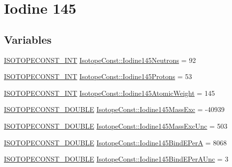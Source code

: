 \hypertarget{group___isotope_const-_iodine-_i145}{}\section{Iodine 145}
\label{group___isotope_const-_iodine-_i145}
\subsection*{Variables}
\begin{DoxyCompactItemize}
\item 
\mbox{\hyperlink{group___isotope_const-_macros_ga5f18360b3e99483a35c32d789e62621c}{I\+S\+O\+T\+O\+P\+E\+C\+O\+N\+S\+T\+\_\+\+I\+NT}} \mbox{\hyperlink{group___isotope_const-_iodine-_i145_ga98c708b0f66b0d1a351314b264bee606}{Isotope\+Const\+::\+Iodine145\+Neutrons}} = 92
\item 
\mbox{\hyperlink{group___isotope_const-_macros_ga5f18360b3e99483a35c32d789e62621c}{I\+S\+O\+T\+O\+P\+E\+C\+O\+N\+S\+T\+\_\+\+I\+NT}} \mbox{\hyperlink{group___isotope_const-_iodine-_i145_gaf9b6429ceabd260cfe07869c8b78bfd1}{Isotope\+Const\+::\+Iodine145\+Protons}} = 53
\item 
\mbox{\hyperlink{group___isotope_const-_macros_ga5f18360b3e99483a35c32d789e62621c}{I\+S\+O\+T\+O\+P\+E\+C\+O\+N\+S\+T\+\_\+\+I\+NT}} \mbox{\hyperlink{group___isotope_const-_iodine-_i145_ga7cd8212733b4a80c68896ba0a40a1b26}{Isotope\+Const\+::\+Iodine145\+Atomic\+Weight}} = 145
\item 
\mbox{\hyperlink{group___isotope_const-_macros_ga8f45a7272ce02c0b4c65c44636ed719a}{I\+S\+O\+T\+O\+P\+E\+C\+O\+N\+S\+T\+\_\+\+D\+O\+U\+B\+LE}} \mbox{\hyperlink{group___isotope_const-_iodine-_i145_gaa3583106a50250e7c514f4ed6eaf710d}{Isotope\+Const\+::\+Iodine145\+Mass\+Exc}} = -\/40939
\item 
\mbox{\hyperlink{group___isotope_const-_macros_ga8f45a7272ce02c0b4c65c44636ed719a}{I\+S\+O\+T\+O\+P\+E\+C\+O\+N\+S\+T\+\_\+\+D\+O\+U\+B\+LE}} \mbox{\hyperlink{group___isotope_const-_iodine-_i145_gac0e20bbd2ee10f7cf2b9816a4c1077e1}{Isotope\+Const\+::\+Iodine145\+Mass\+Exc\+Unc}} = 503
\item 
\mbox{\hyperlink{group___isotope_const-_macros_ga8f45a7272ce02c0b4c65c44636ed719a}{I\+S\+O\+T\+O\+P\+E\+C\+O\+N\+S\+T\+\_\+\+D\+O\+U\+B\+LE}} \mbox{\hyperlink{group___isotope_const-_iodine-_i145_ga7871247444dbc1810634f71a46bac467}{Isotope\+Const\+::\+Iodine145\+Bind\+E\+PerA}} = 8068
\item 
\mbox{\hyperlink{group___isotope_const-_macros_ga8f45a7272ce02c0b4c65c44636ed719a}{I\+S\+O\+T\+O\+P\+E\+C\+O\+N\+S\+T\+\_\+\+D\+O\+U\+B\+LE}} \mbox{\hyperlink{group___isotope_const-_iodine-_i145_ga5cbee202077a2c8fc3284cd512c29cba}{Isotope\+Const\+::\+Iodine145\+Bind\+E\+Per\+A\+Unc}} = 3

\end{DoxyCompactItemize}
